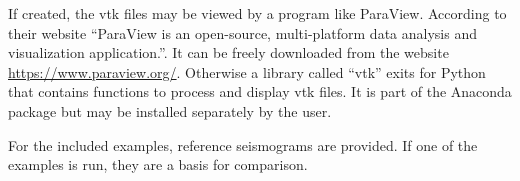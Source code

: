     	If created, the vtk files may be viewed by a program like ParaView. According to their website ``ParaView is an open-source, multi-platform data analysis and visualization application.''. It can be freely downloaded from the website \url{https://www.paraview.org/}. Otherwise a library called ``vtk'' exits for Python that contains functions to process and display vtk files. It is part of the Anaconda package but may be installed separately by the user.
    	
    	For the included examples, reference seismograms are provided. If one of the examples is run, they are a basis for comparison.